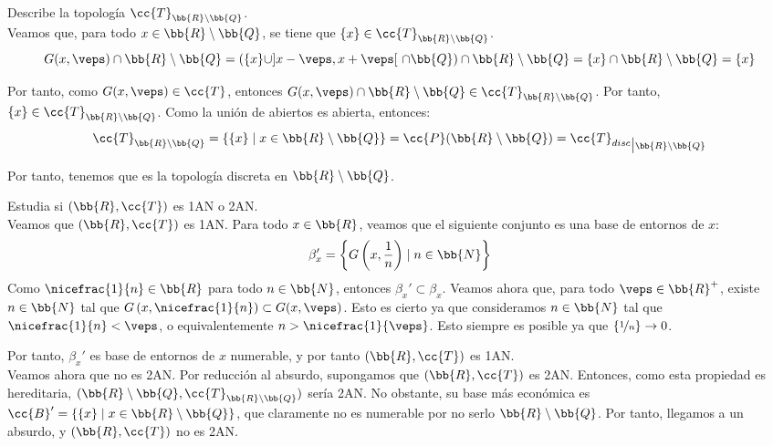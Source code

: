 \documentclass[12pt]{article}
\newcommand{\T}[0]{\cc{T}}
\begin{document}
    \begin{ejercicio}[1 punto]
        Describe la topología $\T_{\bb{R}\setminus \bb{Q}}$.\\

        Veamos que, para todo $x\in \bb{R}\setminus \bb{Q}$, se tiene que $\{x\}\in \T_{\bb{R}\setminus \bb{Q}}$.
        \begin{equation*}
            G(x,\veps)\cap \bb{R}\setminus \bb{Q} =
            \left(\{x\}\cup ]x-\veps,x+\veps[~\cap \bb{Q}\right)\cap \bb{R}\setminus \bb{Q} = \{x\} \cap \bb{R}\setminus \bb{Q} = \{x\}
        \end{equation*}
        
        Por tanto, como $G(x,\veps)\in \T$, entonces $G(x,\veps)\cap \bb{R}\setminus \bb{Q}\in \T_{\bb{R}\setminus \bb{Q}}$. Por tanto, $\{x\}\in \T_{\bb{R}\setminus \bb{Q}}$.
        Como la unión de abiertos es abierta, entonces:
        \begin{equation*}
            \T_{\bb{R}\setminus \bb{Q}} = \{\{x\}\mid x\in \bb{R}\setminus \bb{Q}\} = \cc{P}(\bb{R}\setminus \bb{Q}) = {\T_{disc}}_{\big| \bb{R}\setminus \bb{Q}}
        \end{equation*}

        Por tanto, tenemos que es la topología discreta en $\bb{R}\setminus \bb{Q}$.
    \end{ejercicio}

    \begin{ejercicio}[2 puntos]
        Estudia si $(\bb{R},\T)$ es 1AN o 2AN.\\

        Veamos que $(\bb{R},\T)$ es 1AN. Para todo $x\in \bb{R}$, veamos que el siguiente conjunto es una base de entornos de $x$:
        \begin{equation*}
            \beta_x' = \left\{G\left(x,\frac{1}{n}\right)\mid n\in \bb{N}\right\}
        \end{equation*}
        Como $\nicefrac{1}{n}\in \bb{R}$ para todo $n\in \bb{N}$, entonces $\beta_x'\subset \beta_x$. Veamos ahora que, para todo $\veps\in \bb{R}^+$, existe $n\in \bb{N}$ tal que $G\left(x,\nicefrac{1}{n}\right)\subset G(x,\veps)$.
        Esto es cierto ya que consideramos $n\in \bb{N}$ tal que $\nicefrac{1}{n}<\veps$, o equivalentemente $n>\nicefrac{1}{\veps}$. Esto siempre es posible ya que $\left\{\nicefrac{1}{n}\right\}\to 0$.

        Por tanto, $\beta_x'$ es base de entornos de $x$ numerable, y por tanto $(\bb{R},\T)$ es 1AN.\\

        Veamos ahora que no es 2AN. Por reducción al absurdo, supongamos que $(\bb{R},\T)$ es 2AN. Entonces, como
        esta propiedad es hereditaria, $(\bb{R}\setminus \bb{Q},\T_{\bb{R}\setminus \bb{Q}})$ sería 2AN. No obstante, su base más económica es
        $\cc{B}'=\{\{x\}\mid x\in \bb{R}\setminus \bb{Q}\}$, que claramente no es numerable por no serlo $\bb{R}\setminus \bb{Q}$.
        Por tanto, llegamos a un absurdo, y $(\bb{R},\T)$ no es 2AN.
    \end{ejercicio}
\end{document}

